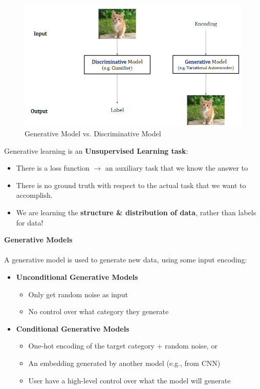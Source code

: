 \begin{figure}[h!t]
    \centering
    \includegraphics[width=0.8\linewidth]{gendis.png}
    \caption{Generative Model vs. Discriminative Model}
    \label{fig:enter-label}
\end{figure}
\newpage

Generative learning is an \textbf{Unsupervised Learning task}:
\begin{itemize}
    \item There is a loss function $\rightarrow$ an auxiliary task that we know the answer to
    \item There is no ground truth with respect to the actual task that we want to accomplish.
    \item We are learning the \textbf{structure \& distribution of data}, rather than labels for data!\\
\end{itemize}
\noindent \textbf{Generative Models}\\
\\A generative model is used to generate new data, using some input encoding:
\begin{itemize}
    \item \textbf{Unconditional Generative Models}
    \begin{itemize}
        \item Only get random noise as input
    \end{itemize}
    \begin{itemize}
        \item No control over what category they generate
    \end{itemize}
    \item \textbf{Conditional Generative Models}
    \begin{itemize}
        \item One-hot encoding of the target category + random noise, or
    \end{itemize}
    \begin{itemize}
        \item An embedding generated by another model (e.g., from CNN)
    \end{itemize}
    \begin{itemize}
        \item User have a high-level control over what the model will generate\\
    \end{itemize}
\end{itemize}

